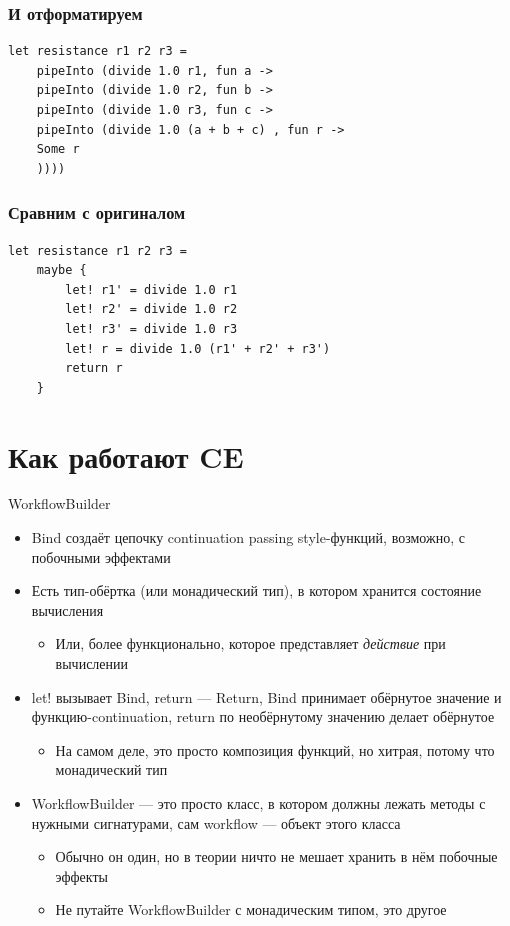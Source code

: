 \documentclass{../../slides-style}
\begin{document}
    \begin{frame}[fragile]
        \frametitle{И отформатируем}
        \begin{verbatim}
let resistance r1 r2 r3 = 
    pipeInto (divide 1.0 r1, fun a ->
    pipeInto (divide 1.0 r2, fun b ->
    pipeInto (divide 1.0 r3, fun c ->
    pipeInto (divide 1.0 (a + b + c) , fun r ->
    Some r
    ))))
        \end{verbatim}
    \end{frame}

    \begin{frame}[fragile]
        \frametitle{Сравним с оригиналом}
        \begin{verbatim}
let resistance r1 r2 r3 = 
    maybe {
        let! r1' = divide 1.0 r1
        let! r2' = divide 1.0 r2
        let! r3' = divide 1.0 r3
        let! r = divide 1.0 (r1' + r2' + r3')
        return r
    }
        \end{verbatim}
    \end{frame}
    
    \section{Как работают CE}

    \begin{frame}{WorkflowBuilder}
        \begin{itemize}
            \item Bind создаёт цепочку continuation passing style-функций, возможно, с побочными эффектами
            \item Есть тип-обёртка (или монадический тип), в котором хранится состояние вычисления
            \begin{itemize}
                \item Или, более функционально, которое представляет \emph{действие} при вычислении
            \end{itemize}
            \item let! вызывает Bind, return --- Return, Bind принимает обёрнутое значение и функцию-continuation, return по необёрнутому значению делает обёрнутое
            \begin{itemize}
                \item На самом деле, это просто композиция функций, но хитрая, потому что монадический тип
            \end{itemize} 
            \item WorkflowBuilder --- это просто класс, в котором должны лежать методы с нужными сигнатурами, сам workflow --- объект этого класса
            \begin{itemize}
                \item Обычно он один, но в теории ничто не мешает хранить в нём побочные эффекты
                \item Не путайте WorkflowBuilder с монадическим типом, это другое
            \end{itemize}
        \end{itemize}
    \end{frame}
\end{document}
